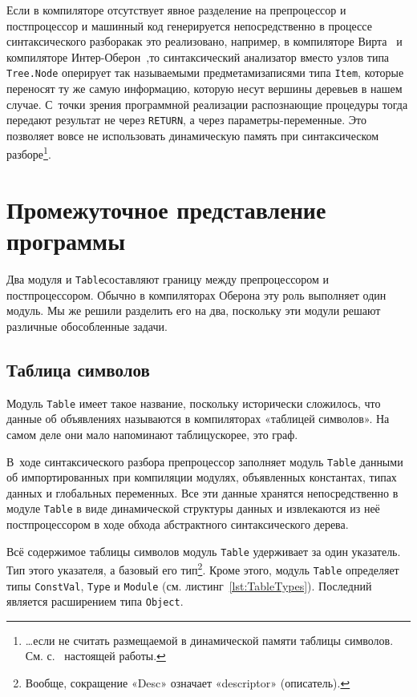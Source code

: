 \documentclass[utf8]{lgu}
\newcommand{\tire}{\unskip\nobreak\thinspace\textemdash\thinspace}
\newcommand{\code}[1]{{\normalsize\texttt{#1}}}
\begin{document}
Если в компиляторе отсутствует явное разделение на препроцессор и постпроцессор и машинный код генерируется непосредственно в процессе синтаксического разбора\tire как это реализовано, например, в компиляторе Вирта~\cite{WirthCompiler} и компиляторе Интер-Оберон~\cite{InterOberon,InterOberonVideo},\tire то синтаксический анализатор вместо узлов типа \code{Tree.Node} оперирует так называемыми предметами\tire записями типа \code{Item}, которые переносят ту же самую информацию, которую несут вершины деревьев в нашем случае. С~точки зрения программной реализации распознающие процедуры тогда передают результат не через \code{RETURN}, а через параметры-переменные. Это позволяет вовсе не использовать динамическую память при синтаксическом разборе\footnote{\ldots если не считать размещаемой в динамической памяти таблицы символов. См. с.~\pageref{sec:SymbolTable} настоящей работы.}.

\section{Промежуточное представление программы}
\label{sec:IntermediateRepresentation}

\firstparskip Два модуля\tire \code{Tree} и \code{Table}\tire составляют границу между препроцессором и постпроцессором. Обычно в компиляторах Оберона эту роль выполняет один модуль. Мы же решили разделить его на два, поскольку эти модули решают различные обособленные задачи.

\subsection{Таблица символов}

\label{sec:SymbolTable}

Модуль \code{Table} имеет такое название, поскольку исторически сложилось, что данные об объявлениях называются в компиляторах «таблицей символов». На самом деле они мало напоминают таблицу\tire скорее, это граф.

В~ходе синтаксического разбора препроцессор заполняет модуль \code{Table} данными об импортированных при компиляции модулях, объявленных константах, типах данных и глобальных переменных. Все эти данные хранятся непосредственно в модуле \code{Table} в виде динамической структуры данных и извлекаются из неё постпроцессором в ходе обхода абстрактного синтаксического дерева.

Всё содержимое таблицы символов модуль \code{Table} удерживает за один указатель\tire \code{topScope}. Тип этого указателя\tire \code{Object}, а базовый его тип\tire \code{ObjectDesc}\footnote{Вообще, сокращение «Desc» означает «descriptor» (описатель).}. Кроме этого, модуль \code{Table} определяет типы \code{ConstVal}, \code{Type} и \code{Module} (см. листинг~\ref{lst:TableTypes}). Последний является расширением типа \code{Object}.
\end{document}
